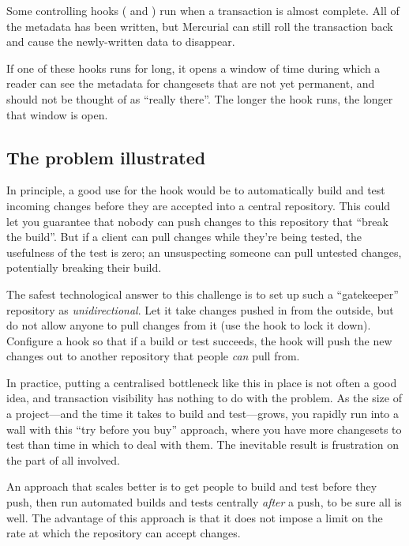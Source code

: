 Some controlling hooks ( and
) run when a transaction is almost complete.
All of the metadata has been written, but Mercurial can still roll the
transaction back and cause the newly-written data to disappear.

If one of these hooks runs for long, it opens a window of time during
which a reader can see the metadata for changesets that are not yet
permanent, and should not be thought of as ``really there''.  The
longer the hook runs, the longer that window is open.

\subsection{The problem illustrated}

In principle, a good use for the  hook would
be to automatically build and test incoming changes before they are
accepted into a central repository.  This could let you guarantee that
nobody can push changes to this repository that ``break the build''.
But if a client can pull changes while they're being tested, the
usefulness of the test is zero; an unsuspecting someone can pull
untested changes, potentially breaking their build.

The safest technological answer to this challenge is to set up such a
``gatekeeper'' repository as \emph{unidirectional}.  Let it take
changes pushed in from the outside, but do not allow anyone to pull
changes from it (use the  hook to lock it down).
Configure a  hook so that if a build or test
succeeds, the hook will push the new changes out to another repository
that people \emph{can} pull from.

In practice, putting a centralised bottleneck like this in place is
not often a good idea, and transaction visibility has nothing to do
with the problem.  As the size of a project---and the time it takes to
build and test---grows, you rapidly run into a wall with this ``try
before you buy'' approach, where you have more changesets to test than
time in which to deal with them.  The inevitable result is frustration
on the part of all involved.

An approach that scales better is to get people to build and test
before they push, then run automated builds and tests centrally
\emph{after} a push, to be sure all is well.  The advantage of this
approach is that it does not impose a limit on the rate at which the
repository can accept changes.

